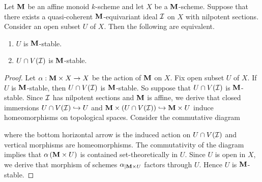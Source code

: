 \begin{proposition}\label{proposition:monoid_open_stable_correspondence}
Let $\mathbf{M}$ be an affine monoid $k$-scheme and let $X$ be a $\mathbf{M}$-scheme. Suppose that there exists a quasi-coherent $\mathbf{M}$-equivariant ideal ${\mathcal I}$ on $X$ with nilpotent sections. Consider an open subset $U$ of $X$. Then the following are equivalent.
\begin{enumerate}[label=\emph{\textbf{(\arabic*)}}, leftmargin=3.0em]
\item $U$ is $\mathbf{M}$-stable.
\item $U\cap V({\mathcal I})$ is $\mathbf{M}$-stable.
\end{enumerate}
\end{proposition}
\begin{proof}
Let $\alpha:\mathbf{M} \times X\rightarrow X$ be the action of $\mathbf{M}$ on $X$. Fix open subset $U$ of $X$. If $U$ is $\mathbf{M}$-stable, then $U\cap V({\mathcal I})$ is $\mathbf{M}$-stable. So suppose that $U\cap V({\mathcal I})$ is $\mathbf{M}$-stable. Since ${\mathcal I}$ has nilpotent sections and $\mathbf{M}$ is affine, we derive that closed immersions $U\cap V({\mathcal I})\hookrightarrow U$ and $\mathbf{M}\times \left(U\cap V({\mathcal I})\right) \hookrightarrow \mathbf{M}\times U$ induce homeomorphisms on topological spaces. Consider the commutative diagram
\begin{center}
\end{center}
where the bottom horizontal arrow is the induced action on $U\cap V({\mathcal I})$ and vertical morphisms are homeomorphisms. The commutativity of the diagram implies that $\alpha\left(\mathbf{M}\times U\right)$ is contained set-theoretically in $U$. Since $U$ is open in $X$, we derive that morphism of schemes $\alpha_{\mid \mathbf{M}\times U}$ factors through $U$. Hence $U$ is $\mathbf{M}$-stable.
\end{proof}

